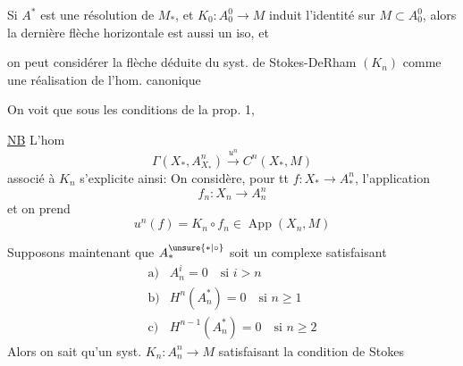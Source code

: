 Si $A^*$ est une résolution de $M_*$, et $K_0:A_0^0\longrightarrow M$ induit l'identité sur $M\subset A_0^0$, alors la dernière flèche horizontale est aussi un iso, et



on peut considérer la flèche
déduite du syst. de Stokes-DeRham $(K_n)$ comme une réalisation de l'hom. canonique

On voit que sous les conditions de la prop. 1, 


\uline{NB} L'hom
\[
\Gamma(X_*,A^n_{X_*})\xrightarrow{u^n}C^n(X_*,M)
\]
associé à $K_n$ s'explicite ainsi: On considère, pour tt   $f:X_*\longrightarrow A_*^n$, l'application
\[
f_n:X_n\longrightarrow A_n^n
\]
et on prend
\[
u^n(f)=K_n\circ f_n\in\operatorname{App}(X_n,M)
\]


Supposons maintenant que $A_*^{\unsure{*|\circ}}$ soit un complexe  satisfaisant
\[
\begin{array}{ll}
\mathrm{a)}& A_n^i=0\quad\text{si }i>n\\
\mathrm{b)}& H^n(A_n^*)=0\quad\text{si }n\geq1\\
\mathrm{c)}& H^{n-1}(A_n^*)=0\quad\text{si }n\geq2
\end{array}
\]
Alors on sait qu'un syst. $K_n:A_n^n\longrightarrow M$ satisfaisant la condition de Stokes


